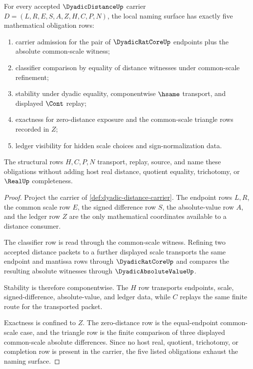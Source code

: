 \begin{theorem}
\label{thm:dyadic-distance-namecert-obligations}
For every accepted $\DyadicDistanceUp$ carrier $D=(L,R,E,S,A,Z,H,C,P,N)$, the local naming surface has exactly five mathematical obligation rows:
\begin{enumerate}
\item carrier admission for the pair of $\DyadicRatCoreUp$ endpoints plus the absolute common-scale witness;
\item classifier comparison by equality of distance witnesses under common-scale refinement;
\item stability under dyadic equality, componentwise $\hsame$ transport, and displayed $\Cont$ replay;
\item exactness for zero-distance exposure and the common-scale triangle rows recorded in $Z$;
\item ledger visibility for hidden scale choices and sign-normalization data.
\end{enumerate}
The structural rows $H,C,P,N$ transport, replay, source, and name these obligations without adding host real distance, quotient equality, trichotomy, or $\RealUp$ completeness.
\end{theorem}
\begin{proof}
Project the carrier of \autoref{def:dyadic-distance-carrier}. The endpoint rows $L,R$, the common scale row $E$, the signed difference row $S$, the absolute-value row $A$, and the ledger row $Z$ are the only mathematical coordinates available to a distance consumer.

The classifier row is read through the common-scale witness. Refining two accepted distance packets to a further displayed scale transports the same endpoint and mantissa rows through $\DyadicRatCoreUp$ and compares the resulting absolute witnesses through $\DyadicAbsoluteValueUp$.

Stability is therefore componentwise. The $H$ row transports endpoints, scale, signed-difference, absolute-value, and ledger data, while $C$ replays the same finite route for the transported packet.

Exactness is confined to $Z$. The zero-distance row is the equal-endpoint common-scale case, and the triangle row is the finite comparison of three displayed common-scale absolute differences. Since no host real, quotient, trichotomy, or completion row is present in the carrier, the five listed obligations exhaust the naming surface.
\end{proof}


